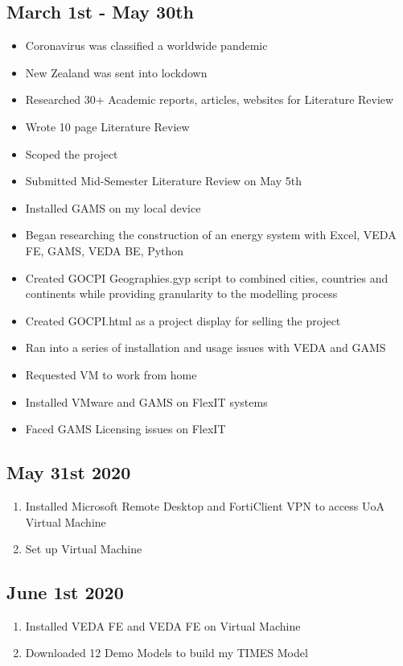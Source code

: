 \documentclass[12pt]{article}
\begin{document}
\subsection*{March 1st - May 30th}
\begin{itemize}
	\item Coronavirus was classified a worldwide pandemic
	\item New Zealand was sent into lockdown
	\item Researched 30+ Academic reports, articles, websites for Literature Review
	\item Wrote 10 page Literature Review
	\item Scoped the project
	\item Submitted Mid-Semester Literature Review on May 5th
	\item Installed GAMS on my local device
	\item Began researching the construction of an energy system with Excel, VEDA FE, GAMS, VEDA BE, Python
	\item Created GOCPI Geographies.gyp script to combined cities, countries and continents while providing granularity to the modelling process
	\item Created GOCPI.html as a project display for selling the project
	\item Ran into a series of installation and usage issues with VEDA and GAMS
	\item Requested VM to work from home
	\item Installed VMware and GAMS on FlexIT systems
	\item Faced GAMS Licensing issues on FlexIT
\end{itemize}
\subsection*{May 31st 2020}
\begin{enumerate}
	\item Installed Microsoft Remote Desktop and FortiClient VPN to access UoA Virtual Machine
	\item Set up Virtual Machine
\end{enumerate}
\subsection*{June 1st 2020}
\begin{enumerate}
	\item Installed VEDA FE and VEDA FE on Virtual Machine
	\item Downloaded 12 Demo Models to build my TIMES Model
\end{enumerate}
\end{document}
